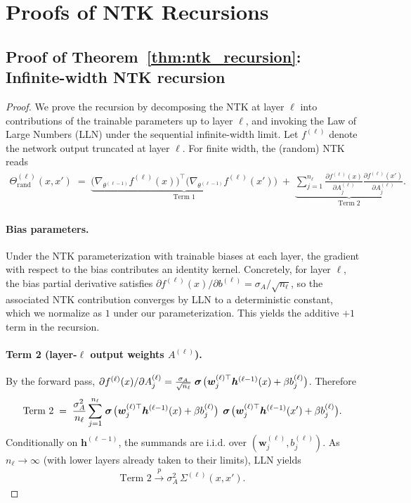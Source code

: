 \section{Proofs of NTK Recursions}
\label{appendix:ntk-recursions}

\subsection{Proof of Theorem~\ref{thm:ntk_recursion}: Infinite-width NTK recursion}
\label{appendix:proof-ntk-recursion}

\begin{proof}
\label{proof:ntk_recursion}
We prove the recursion by decomposing the NTK at layer \( \ell \) into contributions of the trainable parameters up to layer \( \ell \), and invoking the Law of Large Numbers (LLN) under the sequential infinite-width limit. Let \( f^{(\ell)} \) denote the network output truncated at layer \( \ell \). For finite width, the (random) NTK reads
\begin{align}
\Theta^{(\ell)}_{\mathrm{rand}}(x,x') \;=\; \underbrace{\big(\nabla_{\theta^{(\ell-1)}} f^{(\ell)}(x)\big)^\top \big(\nabla_{\theta^{(\ell-1)}} f^{(\ell)}(x')\big)}_{\text{Term 1}} \;+\; \underbrace{\sum_{j=1}^{n_\ell}\frac{\partial f^{(\ell)}(x)}{\partial A^{(\ell)}_j}\frac{\partial f^{(\ell)}(x')}{\partial A^{(\ell)}_j}}_{\text{Term 2}}.
\end{align}

\paragraph{Bias parameters.}
Under the NTK parameterization with trainable biases at each layer, the gradient with respect to the bias contributes an identity kernel. Concretely, for layer \( \ell \), the bias partial derivative satisfies \( \partial f^{(\ell)}(x)/\partial b^{(\ell)} = \sigma_A/\sqrt{n_\ell} \), so the associated NTK contribution converges by LLN to a deterministic constant, which we normalize as \( 1 \) under our parameterization. This yields the additive \( +1 \) term in the recursion.

\paragraph{Term 2 (layer-\(\ell\) output weights \(A^{(\ell)}\)).}
By the forward pass, \(\partial f^{(\ell)}(x)/\partial A^{(\ell)}_j = \frac{\sigma_A}{\sqrt{n_\ell}}\mathrel{\boldsymbol{\sigma}}\!\big(\bm{w}^{(\ell)\top}_j\bm{h}^{(\ell-1)}(x)+\beta b^{(\ell)}_j\big)\). Therefore
\begin{align}
\text{Term 2} \;=\; \frac{\sigma_A^2}{n_\ell}\sum_{j=1}^{n_\ell} \mathrel{\boldsymbol{\sigma}}\!\big(\bm{w}^{(\ell)\top}_j\bm{h}^{(\ell-1)}(x)+\beta b^{(\ell)}_j\big)\,\mathrel{\boldsymbol{\sigma}}\!\big(\bm{w}^{(\ell)\top}_j\bm{h}^{(\ell-1)}(x')+\beta b^{(\ell)}_j\big).
\end{align}
Conditionally on \(\bm{h}^{(\ell-1)}\), the summands are i.i.d. over \((\bm{w}^{(\ell)}_j,b^{(\ell)}_j)\). As \(n_\ell\to\infty\) (with lower layers already taken to their limits), LLN yields
\begin{align}
\text{Term 2} \xrightarrow{p} \sigma_A^2\,\Sigma^{(\ell)}(x,x').
\end{align}


\end{proof}
